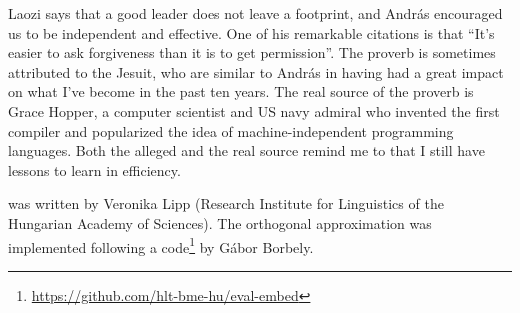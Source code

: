 \documentclass[11pt]{article}
\begin{document}
Laozi says that a good leader does not leave a footprint, and András encouraged
us to be independent and effective. One of his remarkable citations is that
``It's easier to ask forgiveness than it is to get permission''. The proverb is
sometimes attributed to the Jesuit, who are similar to András in having had a
great impact on what I've become in the past ten years. The real source of the
proverb is Grace Hopper, a computer scientist and US navy admiral who invented
the first compiler and popularized the idea of machine-independent programming
languages. Both the alleged and the real source remind me to that I still have
lessons to learn in efficiency.


\smallskip

 was written by Veronika Lipp (Research Institute for
Linguistics of the Hungarian Academy of Sciences). The orthogonal approximation
was implemented following a
code\footnote{\url{https://github.com/hlt-bme-hu/eval-embed}} by Gábor Borbely.



\end{document}
